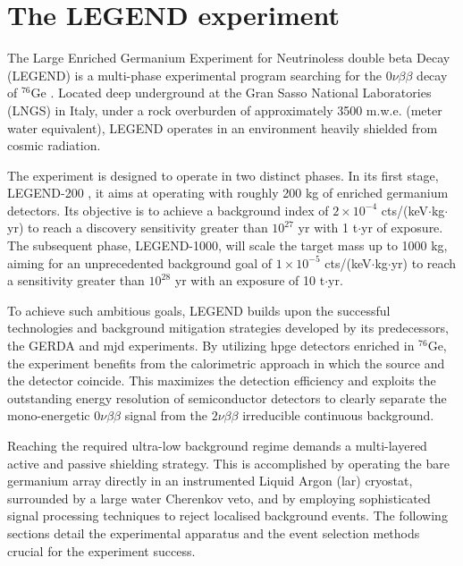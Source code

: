 \chapter{The LEGEND experiment}
\label{ch:legend}

The Large Enriched Germanium Experiment for Neutrinoless double beta Decay (LEGEND) is a multi-phase experimental program searching for the $0\nu\beta\beta$ decay of ${}^{76}$Ge \cite{L1000-design}. Located deep underground at the Gran Sasso National Laboratories (LNGS) in Italy, under a rock overburden of approximately 3500 m.w.e. (meter water equivalent), LEGEND operates in an environment heavily shielded from cosmic radiation.

The experiment is designed to operate in two distinct phases. In its first stage, LEGEND-200 \cite{L200-sep25}, it aims at operating with roughly 200 kg of enriched germanium detectors. Its objective is to achieve a background index of $2 \times 10^{-4}$ cts/(keV$\cdot$kg$\cdot$yr) to reach a discovery sensitivity greater than $10^{27}$ yr with 1 t$\cdot$yr of exposure. The subsequent phase, LEGEND-1000, will scale the target mass up to 1000 kg, aiming for an unprecedented background goal of $1 \times 10^{-5}$ cts/(keV$\cdot$kg$\cdot$yr) to reach a sensitivity greater than $10^{28}$ yr with an exposure of 10 t$\cdot$yr.

To achieve such ambitious goals, LEGEND builds upon the successful technologies and background mitigation strategies developed by its predecessors, the GERDA \cite{GERDA:2017ihb} and \ac{mjd} \cite{Majorana:2013cem} experiments. By utilizing \ac{hpge} detectors enriched in ${}^{76}$Ge, the experiment benefits from the calorimetric approach in which the source and the detector coincide. This maximizes the detection efficiency and exploits the outstanding energy resolution of semiconductor detectors to clearly separate the mono-energetic $0\nu\beta\beta$ signal from the $2\nu\beta\beta$ irreducible continuous background.

Reaching the required ultra-low background regime demands a multi-layered active and passive shielding strategy. This is accomplished by operating the bare germanium array directly in an instrumented Liquid Argon (\ac{lar}) cryostat, surrounded by a large water Cherenkov veto, and by employing sophisticated signal processing techniques to reject localised background events. The following sections detail the experimental apparatus and the event selection methods crucial for the experiment success. \cite{LEGEND:GeDet}

